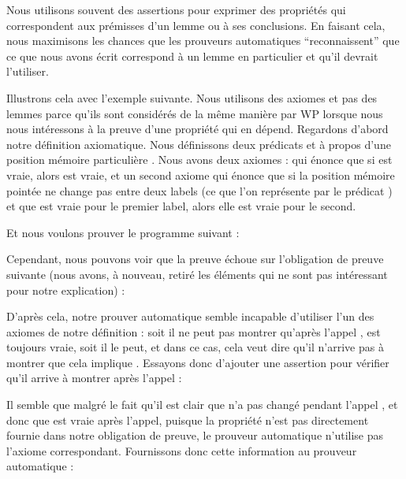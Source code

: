 

Nous utilisons souvent des assertions pour exprimer des propriétés qui
correspondent aux prémisses d'un lemme ou à ses conclusions. En faisant cela,
nous maximisons les chances que les prouveurs automatiques ``reconnaissent''
que ce que nous avons écrit correspond à un lemme en particulier et qu'il
devrait l'utiliser.


Illustrons cela avec l'exemple suivante. Nous utilisons des axiomes et pas des
lemmes parce qu'ils sont considérés de la même manière par WP lorsque nous nous
intéressons à la preuve d'une propriété qui en dépend. Regardons d'abord notre
définition axiomatique. Nous définissons deux prédicats  et
 à propos d'une position mémoire particulière .
Nous avons deux axiomes :  qui énonce que si 
est vraie, alors  est vraie, et un second axiome 
qui énonce que si la position mémoire pointée ne change pas entre deux labels
(ce que l'on représente par le prédicat ) et que 
est vraie pour le premier label, alors elle est vraie pour le second.





Et nous voulons prouver le programme suivant :




Cependant, nous pouvons voir que la preuve échoue sur l'obligation de preuve
suivante (nous avons, à nouveau, retiré les éléments qui ne sont pas intéressant
pour notre explication) :




D'après cela, notre prouver automatique semble incapable d'utiliser l'un des
axiomes de notre définition : soit il ne peut pas montrer qu'après l'appel
,  est toujours vraie, soit il le peut, et
dans ce cas, cela veut dire qu'il n'arrive pas à montrer que cela implique
. Essayons donc d'ajouter une assertion pour vérifier qu'il
arrive à montrer  après l'appel :






Il semble que malgré le fait qu'il est clair que  n'a pas changé
pendant l'appel , et donc que 
est vraie après l'appel, puisque la propriété n'est pas directement fournie dans
notre obligation de preuve, le prouveur automatique n'utilise pas l'axiome
 correspondant. Fournissons donc cette information au prouveur
automatique :


